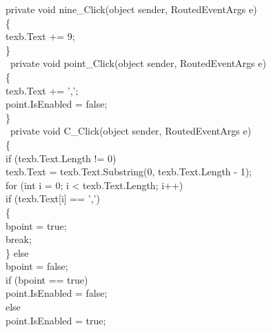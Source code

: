         private void nine\_Click(object sender, RoutedEventArgs e)\\
        \{\\
            texb.Text += 9;\\
        \}\\
\
        private void point\_Click(object sender, RoutedEventArgs e)\\
        \{\\
            texb.Text += ',';\\
            point.IsEnabled = false;\\
        \}\\
\
        private void C\_Click(object sender, RoutedEventArgs e)\\
        \{\\
            if (texb.Text.Length != 0) \\
            texb.Text = texb.Text.Substring(0, texb.Text.Length - 1);\\
            for (int i = 0; i < texb.Text.Length; i++)\\
                if (texb.Text[i] == ',')\\
                \{\\
                    bpoint = true;\\
                    break;\\
                \}
                else\\
                    bpoint = false;\\


            if (bpoint == true)\\
                point.IsEnabled = false;\\

            else\\
                point.IsEnabled = true;\\
\\

